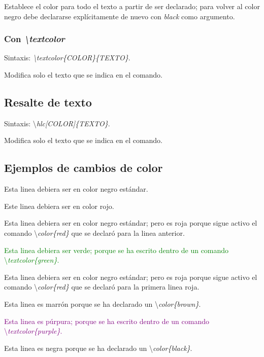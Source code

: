 Establece el color para todo el texto a partir de ser declarado; para volver al color negro debe declararse explícitamente de nuevo con \textit{black} como argumento.
%
\subsubsection{Con \textit{\textbackslash textcolor}}
Sintaxis: \textit{\textbackslash textcolor\{COLOR\}\{TEXTO\}}.

Modifica solo el texto que se indica en el comando.
%
\subsection{Resalte de texto}
Sintaxis: \textbackslash \textit{hlc[COLOR]\{TEXTO\}}.

Modifica solo el texto que se indica en el comando.
%
\subsection{Ejemplos de cambios de color}
Esta linea debiera ser en color negro estándar.

\color{red}
Este linea debiera ser en color rojo.

Esta linea debiera ser en color negro estándar; pero es roja porque sigue activo el comando \textbackslash \textit{color\{red\}} que se declaró para la linea anterior.

\textcolor{green}{Esta linea debiera ser verde; porque se ha escrito dentro de un comando \textbackslash \textit{textcolor\{green\}}.}

Esta linea debiera ser en color negro estándar; pero es roja porque sigue activo el comando \textbackslash \textit{color\{red\}} que se declaró para la primera linea roja.

\color{brown}
Esta linea es marrón porque se ha declarado un \textbackslash \textit{color\{brown\}}.

\textcolor{purple}{Esta linea es púrpura; porque se ha escrito dentro de un comando \textbackslash \textit{textcolor\{purple\}}.}


\color{black}
Esta linea es negra porque se ha declarado un \textbackslash \textit{color\{black\}}.


